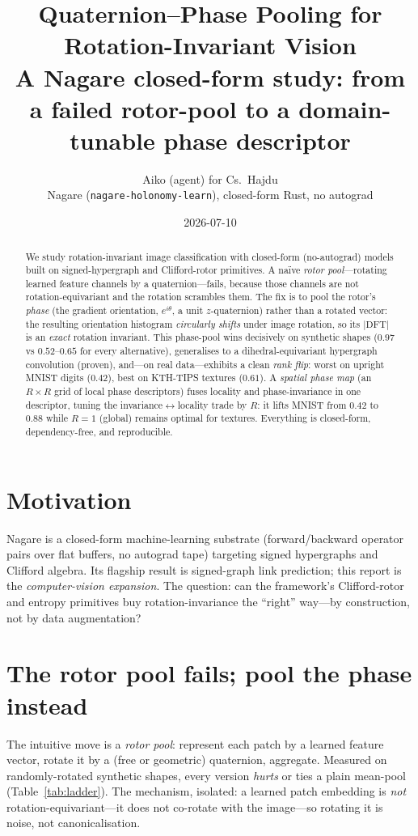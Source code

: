 \documentclass[11pt]{article}
\title{\textbf{Quaternion--Phase Pooling for Rotation-Invariant Vision}\\[2pt]
\large A Nagare closed-form study: from a failed rotor-pool to a domain-tunable phase descriptor}
\author{Aiko (agent) for Cs.\ Hajdu \\ \small Nagare (\texttt{nagare-holonomy-learn}), closed-form Rust, no autograd}
\date{2026-07-10}
\begin{document}
\maketitle

\begin{abstract}
We study rotation-invariant image classification with closed-form (no-autograd) models built on
signed-hypergraph and Clifford-rotor primitives. A na\"ive \emph{rotor pool}---rotating learned
feature channels by a quaternion---fails, because those channels are not rotation-equivariant and
the rotation scrambles them. The fix is to pool the rotor's \emph{phase} (the gradient orientation,
$e^{i\theta}$, a unit $z$-quaternion) rather than a rotated vector: the resulting orientation
histogram \emph{circularly shifts} under image rotation, so its $|\mathrm{DFT}|$ is an
\emph{exact} rotation invariant. This phase-pool wins decisively on synthetic shapes ($0.97$ vs
$0.52$--$0.65$ for every alternative), generalises to a dihedral-equivariant hypergraph convolution
(proven), and---on real data---exhibits a clean \emph{rank flip}: worst on upright MNIST digits
($0.42$), best on KTH-TIPS textures ($0.61$). A \emph{spatial phase map} (an $R\times R$ grid of
local phase descriptors) fuses locality and phase-invariance in one descriptor, tuning the
invariance$\leftrightarrow$locality trade by $R$: it lifts MNIST from $0.42$ to $0.88$ while $R{=}1$
(global) remains optimal for textures. Everything is closed-form, dependency-free, and reproducible.
\end{abstract}

\section{Motivation}
Nagare is a closed-form machine-learning substrate (forward/backward operator pairs over flat
buffers, no autograd tape) targeting signed hypergraphs and Clifford algebra. Its flagship result is
signed-graph link prediction; this report is the \emph{computer-vision expansion}. The question:
can the framework's Clifford-rotor and entropy primitives buy rotation-invariance the ``right''
way---by construction, not by data augmentation?

\section{The rotor pool fails; pool the phase instead}
The intuitive move is a \emph{rotor pool}: represent each patch by a learned feature vector, rotate
it by a (free or geometric) quaternion, aggregate. Measured on randomly-rotated synthetic shapes,
every version \emph{hurts} or ties a plain mean-pool (Table~\ref{tab:ladder}). The mechanism, isolated:
a learned patch embedding is \emph{not} rotation-equivariant---it does not co-rotate with the
image---so rotating it is noise, not canonicalisation.
\end{document}
